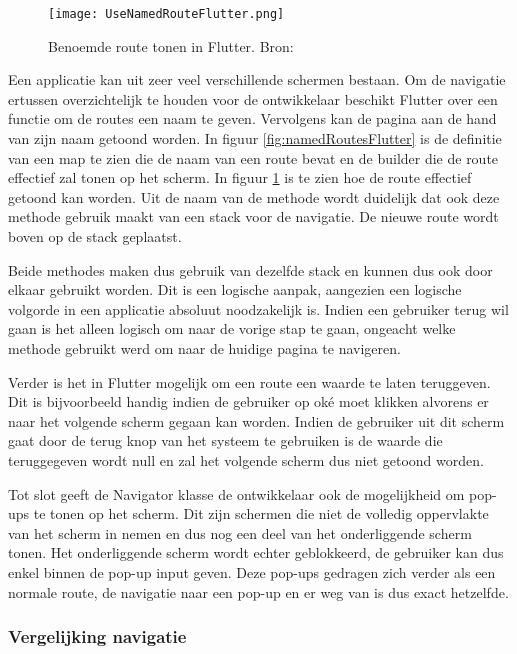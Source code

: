 \begin{figure}
    \texttt{[image: UseNamedRouteFlutter.png]}
    \caption{Benoemde route tonen in Flutter. Bron: \textcite{Flutter.dev2020}}
    \label{fig:useNamedRoutesFlutter}
\end{figure}

Een applicatie kan uit zeer veel verschillende schermen bestaan. Om de navigatie
ertussen overzichtelijk te houden voor de ontwikkelaar beschikt Flutter over een
functie om de routes een naam te geven. Vervolgens kan de pagina aan de hand van
zijn naam getoond worden. In figuur \ref{fig:namedRoutesFlutter} is de definitie
van een map te zien die de naam van een route bevat en de builder die de route
effectief zal tonen op het scherm. In figuur \ref{fig:useNamedRoutesFlutter} is
te zien hoe de route effectief getoond kan worden. Uit de naam van de methode
wordt duidelijk dat ook deze methode gebruik maakt van een stack voor de
navigatie. De nieuwe route wordt boven op de stack geplaatst.

Beide methodes maken dus gebruik van dezelfde stack en kunnen dus ook door
elkaar gebruikt worden. Dit is een logische aanpak, aangezien een logische
volgorde in een applicatie absoluut noodzakelijk is. Indien een gebruiker terug
wil gaan is het alleen logisch om naar de vorige stap te gaan, ongeacht welke
methode gebruikt werd om naar de huidige pagina te navigeren. 

Verder is het in Flutter mogelijk om een route een waarde te laten teruggeven.
Dit is bijvoorbeeld handig indien de gebruiker op oké moet klikken alvorens er
naar het volgende scherm gegaan kan worden. Indien de gebruiker uit dit scherm
gaat door de terug knop van het systeem te gebruiken is de waarde die
teruggegeven wordt null en zal het volgende scherm dus niet getoond worden.

Tot slot geeft de Navigator klasse de ontwikkelaar ook de mogelijkheid om pop-ups
te tonen op het scherm. Dit zijn schermen die niet de volledig oppervlakte van
het scherm in nemen en dus nog een deel van het onderliggende scherm tonen. Het
onderliggende scherm wordt echter geblokkeerd, de gebruiker kan dus enkel binnen
de pop-up input geven. Deze pop-ups gedragen zich verder als een normale route, de
navigatie naar een pop-up en er weg van is dus exact hetzelfde.

\subsubsection{Vergelijking navigatie}
\label{subsubsec:vglNavigatie}

